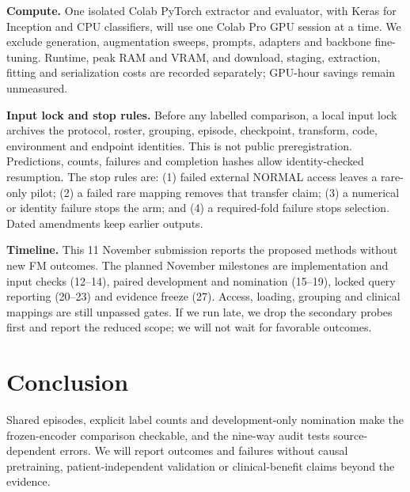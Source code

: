 \documentclass[conference]{IEEEtran}
\newcommand{\claim}[1]{} %
\begin{document}
\claim{C29}
\textbf{Compute.} One isolated Colab PyTorch extractor and evaluator, with Keras for Inception and CPU classifiers, will use one Colab Pro GPU session at a time. We exclude generation, augmentation sweeps, prompts, adapters and backbone fine-tuning. Runtime, peak RAM and VRAM, and download, staging, extraction, fitting and serialization costs are recorded separately; GPU-hour savings remain unmeasured.

\claim{C30}
\textbf{Input lock and stop rules.} Before any labelled comparison, a local input lock archives the protocol, roster, grouping, episode, checkpoint, transform, code, environment and endpoint identities. This is not public preregistration. Predictions, counts, failures and completion hashes allow identity-checked resumption. The stop rules are: (1) failed external NORMAL access leaves a rare-only pilot; (2) a failed rare mapping removes that transfer claim; (3) a numerical or identity failure stops the arm; and (4) a required-fold failure stops selection. Dated amendments keep earlier outputs.

\claim{C31}
\textbf{Timeline.} This 11 November submission reports the proposed methods without new FM outcomes. The planned November milestones are implementation and input checks (12--14), paired development and nomination (15--19), locked query reporting (20--23) and evidence freeze (27). Access, loading, grouping and clinical mappings are still unpassed gates. If we run late, we drop the secondary probes first and report the reduced scope; we will not wait for favorable outcomes.

\section{Conclusion}
Shared episodes, explicit label counts and development-only nomination make the frozen-encoder comparison checkable, and the nine-way audit tests source-dependent errors. We will report outcomes and failures without causal pretraining, patient-independent validation or clinical-benefit claims beyond the evidence.



\end{document}
